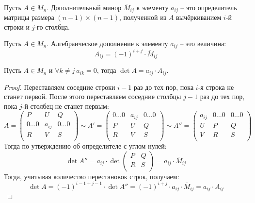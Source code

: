 \documentclass[12pt]{article}
\begin{document}
\begin{definition}
	Пусть $A\in M_n$. Дополнительный минор $\bar{M}_{ij}$ к
	элементу $a_{ij}$ -- это
	определитель матрицы размера $(n-1)\times (n-1)$, полученной из $A$
	вычёркиванием $i$-й строки и $j$-го столбца.
\end{definition}
\begin{definition}
	Пусть $A\in M_n$. Алгебраическое дополнение к элементу $a_{ij}$ --
	это величина:
	\[A_{ij}=(-1)^{i+j}\cdot \bar{M}_{ij}\]
\end{definition}
\begin{lemma}
	Пусть $A\in M_n$ и $\forall k\neq j\ a_{ik}=0$, тогда $\det
	A=a_{ij}\cdot A_{ij}$.
	\begin{proof}
		Переставляем соседние строки $i-1$ раз до тех пор, пока $i$-я
		строка не станет первой. После этого переставляем соседние столбцы
		$j-1$ раз до тех пор, пока $j$-й столбец не станет первым:
		\[A=
			\begin{pmatrix}
				P & U & Q\\
				0\ldots0 & a_{ij} & 0\ldots0\\
				R & V & S\\
			\end{pmatrix}\sim A'=
			\begin{pmatrix}
				0\ldots0 & a_{ij} & 0\ldots0\\
				P & U & Q\\
				R & V & S\\
			\end{pmatrix}\sim A''=
			\begin{pmatrix}
				a_{ij} & 0\ldots0 & 0\ldots0\\
				U & P & Q\\
				V & R & S\\
		\end{pmatrix}\]		Тогда по утверждению об определителе с углом нулей:
		\[\det A''=a_{ij}\cdot\det
			\begin{pmatrix}
				P & Q\\
				R & S\\
		\end{pmatrix}=a_{ij}\cdot \bar{M}_{ij}\]		Тогда, учитывая
		количество перестановок строк, получаем:
		\[\det A=(-1)^{i-1+j-1}\cdot\det A''=(-1)^{i+j}\cdot a_{ij}\cdot
		\bar{M}_{ij}=a_{ij}\cdot A_{ij}\]	
	\end{proof}
\end{lemma}
\end{document}
